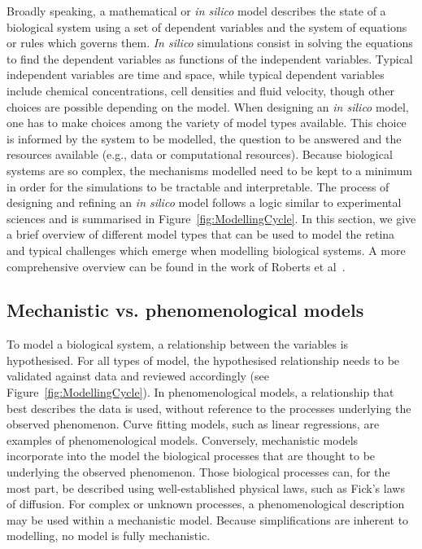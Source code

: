 \documentclass{article}
\begin{document}
Broadly speaking, a mathematical or \textit{in silico} model describes the state of a biological system using a set of dependent variables and the system of equations or rules which governs them.
\textit{In silico} simulations consist in solving the equations to find the dependent variables as functions of the independent variables.
Typical independent variables are time and space, while typical dependent variables include chemical concentrations, cell densities and fluid velocity, though other choices are possible depending on the model.
When designing an \textit{in silico} model, one has to make choices among the variety of model types available.
This choice is informed by the system to be modelled, the question to be answered and the resources available (e.g., data or computational resources).
Because biological systems are so complex, the mechanisms modelled need to be kept to a minimum in order for the simulations to be tractable and interpretable.
The process of designing and refining an \textit{in silico} model follows a logic similar to experimental sciences and is summarised in Figure~\ref{fig:ModellingCycle}.
In this section, we give a brief overview of different model types that can be used to model the retina and typical challenges which emerge when modelling biological systems.
A more comprehensive overview can be found in the work of Roberts et al~\cite{Roberts_2016}.

\subsection{Mechanistic vs. phenomenological models}

To model a biological system, a relationship between the variables is hypothesised.
For all types of model, the hypothesised relationship needs to be validated against data and reviewed accordingly (see Figure~\ref{fig:ModellingCycle}).
In phenomenological models, a relationship that best describes the data is used, without reference to the processes underlying the observed phenomenon.
Curve fitting models, such as linear regressions, are examples of phenomenological models.
Conversely, mechanistic models incorporate into the model the biological processes that are thought to be underlying the observed phenomenon.
Those biological processes can, for the most part, be described using well-established physical laws, such as Fick's laws of diffusion.
For complex or unknown processes, a phenomenological description may be used within a mechanistic model.
Because simplifications are inherent to modelling, no model is fully mechanistic. %
\end{document}
